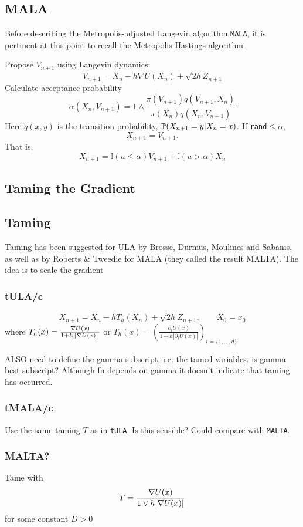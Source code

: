 \subsection{MALA}
Before describing the Metropolis-adjusted Langevin algorithm \texttt{MALA}, it is pertinent at this point to recall the Metropolis Hastings algorithm \cite{Metropolis53,Hastings70}.


Propose \(V_{n+1}\) using Langevin dynamics:
\[V_{n+1} = X_n -h \nabla U(X_n) +\sqrt{2h} Z_{n+1}\]
Calculate acceptance probability
\[\alpha(X_n,V_{n+1}) = 1\wedge \frac{\pi(V_{n+1})q(V_{n+1},X_n)}{\pi(X_n)q(X_n,V_{n+1})}\]
Here \(q(x,y)\) is the transition probability, \(\P(X_{n+1}=y | X_{n}=x)\). If \texttt{rand}\(\leq\alpha\), 
\[X_{n+1} = V_{n+1}.\]
That is,
\[X_{n+1} = \mathbb{I}(u\leq \alpha)V_{n+1} +\mathbb{I}(u > \alpha)X_n \]

\subsection{Taming the Gradient}
\subsection{Taming}
Taming has been suggested for ULA by Brosse, Durmus, Moulines and Sabanis, as well as by Roberts \& Tweedie for MALA (they called the result MALTA). The idea is to scale the gradient 

\subsubsection{tULA/c}
\[X_{n+1} = X_n -h T_{h}(X_n) +\sqrt{2h} Z_{n+1},\qquad X_0= x_0 \]
where \(T_{h}(x) = \frac{\grad U(x)}{1+h\|\grad U(x)\|}\) or \(T_{h}(x) =\left(\frac{\partial_i U(x)}{1+h|\partial_i U(x)|}\right)_{i=\lbrace 1, \dots, d\rbrace} \)

ALSO need to define the gamma subscript, i.e. the tamed variables. is gamma best subscript? Although fn depends on gamma it doesn't indicate that taming has occurred.
\subsubsection{tMALA/c}
Use the same taming \(T\) as in \texttt{tULA}. Is this sensible? Could compare with \texttt{MALTA}.
\subsubsection{MALTA?}\cite{RT96}
Tame with 
\[T = \frac{ \grad U(x)}{1\vee h |\grad U(x)|}\]
for some constant \(D>0\)

